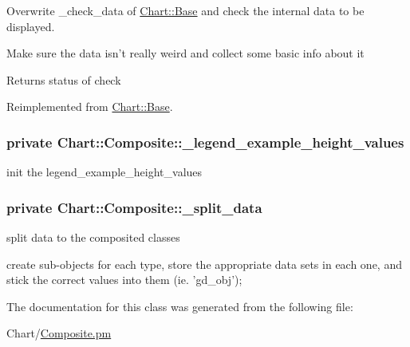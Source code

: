 Overwrite \_\-check\_\-data of \hyperlink{classChart_1_1Base}{Chart::Base} and check the internal data to be displayed. 

Make sure the data isn't really weird and collect some basic info about it\par
 \begin{DoxyReturn}{Returns}
status of check 
\end{DoxyReturn}


Reimplemented from \hyperlink{classChart_1_1Base_a13296be5b92a9880851977fe0abfdf01}{Chart::Base}.

\hypertarget{classChart_1_1Composite_aa088e48fc82810b46bde41f468897335}{
\subsubsection[{\_\-legend\_\-example\_\-height\_\-values}]{\setlength{\rightskip}{0pt plus 5cm}private {\bf Chart::Composite::\_\-legend\_\-example\_\-height\_\-values}}}
\label{classChart_1_1Composite_aa088e48fc82810b46bde41f468897335}


init the legend\_\-example\_\-height\_\-values 

\hypertarget{classChart_1_1Composite_ae4eb768b4ef9d49dc0011bc3f49dab93}{
\subsubsection[{\_\-split\_\-data}]{\setlength{\rightskip}{0pt plus 5cm}private {\bf Chart::Composite::\_\-split\_\-data}}}
\label{classChart_1_1Composite_ae4eb768b4ef9d49dc0011bc3f49dab93}


split data to the composited classes 

create sub-\/objects for each type, store the appropriate data sets in each one, and stick the correct values into them (ie. 'gd\_\-obj'); 

The documentation for this class was generated from the following file:\begin{DoxyCompactItemize}
\item 
Chart/\hyperlink{Composite_8pm}{Composite.pm}\end{DoxyCompactItemize}
